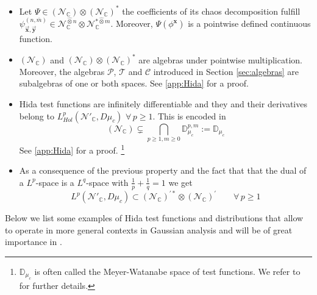 \documentclass{elsarticle}%
\begin{document}
 \begin{itemize}
   \item Let $\Psi\in (\mathcal{N}_\mathbb{C})\otimes (\mathcal{N}_\mathbb{C})^*$ the coefficients of its chaos decomposition fulfill $\psi^{(n,\bar{m})}_{\vec{\mathbf{x}},\vec{\mathbf{y}}}\in \mathcal{N}_\mathbb{C}^{\hat\otimes n}\otimes \mathcal{N}_\mathbb{C}^{* \hat\otimes m}$. Moreover, $\Psi(\phi^\mathbf{x})$ is a pointwise defined continuous function. 
     \item $(\mathcal{N}_{\mathbb{C}})$ and $(\mathcal{N}_\mathbb{C})\otimes (\mathcal{N}_\mathbb{C})^*$ are algebras under pointwise multiplication. Moreover, the algebras $\mathcal{P}$, $\mathcal{T}$ and $\mathcal{C}$ introduced in Section \ref{sec:algebras} are subalgebras of one or both spaces. See \ref{app:Hida} for a proof.
   \item   Hida test functions are infinitely differentiable and they and their derivatives belong to $L^p_{Hol}(\mathcal{N}'_{\mathbb{C}},D\mu_c)$ $\forall\, p\geq 1$. This is encoded in $$(\mathcal{N}_\mathbb{C})\subsetneq \bigcap\limits_{p\geq1, m\geq 0}\mathbb{D}^{p,m}_{\mu_c}:= \mathbb{D}_{\mu_c}$$
    See \ref{app:Hida} for a proof. \footnote{$\mathbb{D}_{\mu_c}$ is often called the Meyer-Watanabe space of test functions. We refer to \cite{huAnalysisGaussian2016,hidaWhiteNoise1993} for further details.} 
   \item  As a consequence of the previous property and the fact that that the dual of a $L^p$-space is a $L^q$-space with $\frac{1}p+\frac{1}q= 1$ we get 
   $$L^p(\mathcal{N}'_{\mathbb{C}},D\mu_c)\subset (\mathcal{N}_{\mathbb{C}})^{\prime \ast}\otimes (\mathcal{N}_\mathbb{C})^\prime\qquad \forall\, p\geq 1$$

 \end{itemize}

 Below we list some examples of Hida test functions and distributions that allow to operate in more general contexts in Gaussian analysis and will be of great importance in \cite{alonsoGeometricFlavours2024}.
  

 
\end{document}
